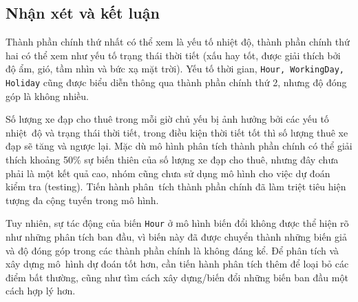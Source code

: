 \subsection*{Nhận xét và kết luận}

Thành phần chính thứ nhất có thể xem là yếu tố nhiệt độ, thành phần chính thứ hai có thể xem như yếu tố trạng thái thời tiết (xấu hay tốt, được giải thích bởi độ ẩm, gió, tầm nhìn và bức xạ mặt trời). Yếu tố thời gian, \texttt{Hour, WorkingDay, Holiday} cũng được biểu diễn thông qua thành phần chính thứ 2, nhưng độ đóng góp là không nhiều. 

Số lượng xe đạp cho thuê trong mỗi giờ chủ yếu bị ảnh hưởng bởi các yếu tố nhiệt~độ và trạng thái thời tiết, trong điều kiện thời tiết tốt thì số lượng thuê xe đạp sẽ tăng và ngược lại.
Mặc dù mô hình phân tích thành phần chính có thể giải thích khoảng 50\% sự biến thiên của số lượng xe đạp cho thuê, nhưng đây chưa phải là một kết quả cao, nhóm cũng chưa sử dụng mô hình cho việc dự đoán kiểm tra (testing). Tiến hành phân~tích thành phần chính đã làm triệt tiêu hiện tượng đa cộng tuyến trong mô hình. 

Tuy nhiên, sự tác động của biến \texttt{Hour} ở mô hình biến đổi không được thể hiện rõ như những phân tích ban đầu, vì biến này đã được chuyển thành những biến giả và độ đóng góp trong các thành phần chính là không đáng kể. Để phân tích và xây dựng mô~hình dự đoán tốt hơn, cần tiến hành phân tích thêm để loại bỏ các điểm bất thường, cũng như tìm cách xây dựng/biến đổi những biến ban đầu một cách hợp lý hơn.